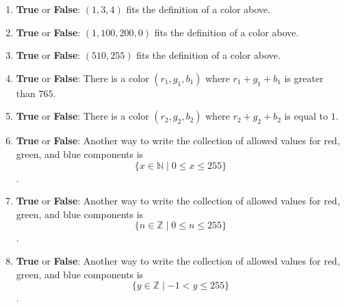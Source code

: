 \documentclass[12pt, oneside]{article}
\begin{document}
\begin{enumerate}
\begin{enumerate}
\item \textbf{True} or \textbf{False}: $(1, 3, 4)$ fits the definition of a color above.
\item \textbf{True} or \textbf{False}: $(1, 100, 200, 0)$ fits the definition of a color above.
\item \textbf{True} or \textbf{False}: $(510, 255)$ fits the definition of a color above.
\item \textbf{True} or \textbf{False}: There is a color $(r_1, g_1, b_1)$ where $r_1 + g_1 + b_1$ is greater than $765$.
\item \textbf{True} or \textbf{False}: There is a color $(r_2, g_2, b_2)$ where $r_2 + g_2 + b_2$ is equal to $1$.
\item \textbf{True} or \textbf{False}: Another way to write the collection of allowed values for red, green, and blue components is $$\{x \in \mathbb{N}\mid 0 \leq x \leq 255 \}$$.
\item \textbf{True} or \textbf{False}: Another way to write the collection of allowed values for red, green, and blue components is $$\{n \in \mathbb{Z}\mid 0 \leq n \leq 255 \}$$.
\item \textbf{True} or \textbf{False}: Another way to write the collection of allowed values for red, green, and blue components is $$\{y \in \mathbb{Z}\mid -1 < y \leq 255 \}$$.
\end{enumerate}

\end{enumerate}
\end{document}
